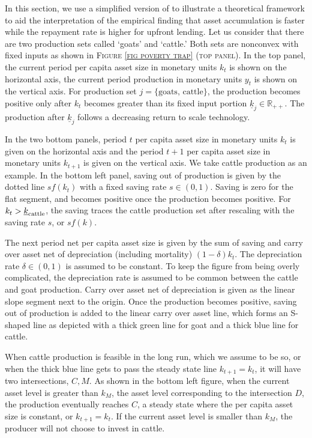 \vspace{2ex}
	In this section, we use a simplified version of \citet{GalorZeira1993} to illustrate a theoretical framework to aid the interpretation of the empirical finding that asset accumulation is faster while the repayment rate is higher for upfront lending. Let us consider that there are two production sets called `goats' and `cattle.' Both sets are nonconvex with fixed inputs as shown in \textsc{\small Figure \ref{fig poverty trap} (top panel)}. 
	In the top panel, the current period per capita asset size in monetary units $k_{t}$ is shown on the horizontal axis, the current period production in monetary units $y_{t}$ is shown on the vertical axis. For production set $j=\{\mbox{goats, cattle}\}$, the production becomes positive only after $k_{t}$ becomes greater than its fixed input portion $\underline{k}_{j}\in\mathbb R_{++}$.  The production after $\underline{k}_{j}$ follows a decreasing return to scale technology. 
	
	In the two bottom panels, period $t$ per capita asset size in monetary units $k_{t}$ is given on the horizontal axis and the period $t+1$ per capita asset size in monetary units $k_{t+1}$ is given on the vertical axis. We take cattle production as an example. In the bottom left panel, saving out of production is given by the dotted line $sf(k_{t})$ with a fixed saving rate $s\in(0, 1)$. Saving is zero for the flat segment, and becomes positive once the production becomes positive. For $k_{t}>\underline{k}_{\mbox{\scriptsize cattle}}$, the saving traces the cattle production set after rescaling with the saving rate $s$, or $sf(k)$. 
	
	The next period net per capita asset size is given by the sum of saving and carry over asset net of depreciation (including mortality) $(1-\delta)k_{t}$.  The depreciation rate $\delta\in(0, 1)$ is assumed to be constant. To keep the figure from being overly complicated, the depreciation rate is assumed to be common between the cattle and goat production. Carry over asset net of depreciation is given as the linear slope segment next to the origin. Once the production becomes positive, saving out of production is added to the linear carry over asset line, which forms an S-shaped line as depicted with a thick green line for goat and a thick blue line for cattle. 
	
	When cattle production is feasible in the long run, which we assume to be so, or when the thick blue line gets to pass the steady state line $k_{t+1}=k_{t}$, it will have two intersections, $C, M$. As shown in the bottom left figure, when the current asset level is greater than $k_{M}$, the asset level corresponding to the intersection $D$, the production eventually reaches $C$, a steady state where the per capita asset size is constant, or $k_{t+1}=k_{t}$. If the current asset level is smaller than $k_{M}$, the producer  will not choose to invest in cattle.

